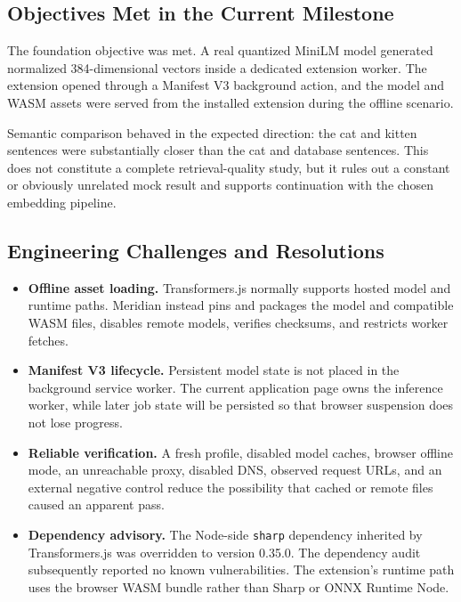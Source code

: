 \documentclass{tietreport}
\begin{document}
\subsection{Objectives Met in the Current Milestone}

The foundation objective was met. A real quantized MiniLM model generated normalized
384-dimensional vectors inside a dedicated extension worker. The extension opened through a
Manifest V3 background action, and the model and WASM assets were served from the installed
extension during the offline scenario.

Semantic comparison behaved in the expected direction: the cat and kitten sentences were
substantially closer than the cat and database sentences. This does not constitute a complete
retrieval-quality study, but it rules out a constant or obviously unrelated mock result and
supports continuation with the chosen embedding pipeline.

\subsection{Engineering Challenges and Resolutions}

\begin{itemize}
  \item \textbf{Offline asset loading.} Transformers.js normally supports hosted model and
    runtime paths. Meridian instead pins and packages the model and compatible WASM files,
    disables remote models, verifies checksums, and restricts worker fetches.

  \item \textbf{Manifest V3 lifecycle.} Persistent model state is not placed in the background
    service worker. The current application page owns the inference worker, while later job
    state will be persisted so that browser suspension does not lose progress.

  \item \textbf{Reliable verification.} A fresh profile, disabled model caches, browser offline
    mode, an unreachable proxy, disabled DNS, observed request URLs, and an external negative
    control reduce the possibility that cached or remote files caused an apparent pass.

  \item \textbf{Dependency advisory.} The Node-side \texttt{sharp} dependency inherited by
    Transformers.js was overridden to version 0.35.0. The dependency audit subsequently
    reported no known vulnerabilities. The extension's runtime path uses the browser WASM
    bundle rather than Sharp or ONNX Runtime Node.
\end{itemize}
\end{document}
